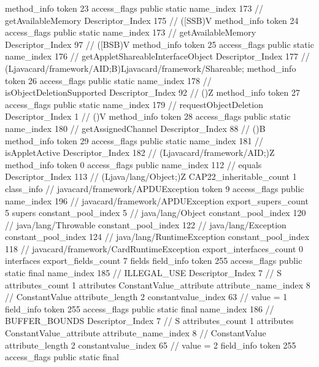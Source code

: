 {{{{{				}
				method_info {
					token	23
					access_flags	public static
					name_index	173		// getAvailableMemory
					Descriptor_Index	175		// ([SSB)V
				}
				method_info {
					token	24
					access_flags	public static
					name_index	173		// getAvailableMemory
					Descriptor_Index	97		// ([BSB)V
				}
				method_info {
					token	25
					access_flags	public static
					name_index	176		// getAppletShareableInterfaceObject
					Descriptor_Index	177		// (Ljavacard/framework/AID;B)Ljavacard/framework/Shareable;
				}
				method_info {
					token	26
					access_flags	public static
					name_index	178		// isObjectDeletionSupported
					Descriptor_Index	92		// ()Z
				}
				method_info {
					token	27
					access_flags	public static
					name_index	179		// requestObjectDeletion
					Descriptor_Index	1		// ()V
				}
				method_info {
					token	28
					access_flags	public static
					name_index	180		// getAssignedChannel
					Descriptor_Index	88		// ()B
				}
				method_info {
					token	29
					access_flags	public static
					name_index	181		// isAppletActive
					Descriptor_Index	182		// (Ljavacard/framework/AID;)Z
				}
				method_info {
					token	0
					access_flags	public
					name_index	112		// equals
					Descriptor_Index	113		// (Ljava/lang/Object;)Z
				}
			}
			CAP22_inheritable_count	1
		}
		class_info {		// javacard/framework/APDUException
			token	9
			access_flags	public
			name_index	196		// javacard/framework/APDUException
			export_supers_count	5
			supers {
				constant_pool_index	5		// java/lang/Object
				constant_pool_index	120		// java/lang/Throwable
				constant_pool_index	122		// java/lang/Exception
				constant_pool_index	124		// java/lang/RuntimeException
				constant_pool_index	118		// javacard/framework/CardRuntimeException
			}
			export_interfaces_count	0
			interfaces {
			}
			export_fields_count	7
			fields {
			field_info {
				token	255
				access_flags	public static final
				name_index	185		// ILLEGAL_USE
				Descriptor_Index	7		// S
				attributes_count	1
				attributes {
				ConstantValue_attribute {
					attribute_name_index	8		// ConstantValue
					attribute_length	2
					constantvalue_index	63		// value = 1
				}
				}
			}
			field_info {
				token	255
				access_flags	public static final
				name_index	186		// BUFFER_BOUNDS
				Descriptor_Index	7		// S
				attributes_count	1
				attributes {
				ConstantValue_attribute {
					attribute_name_index	8		// ConstantValue
					attribute_length	2
					constantvalue_index	65		// value = 2
				}
				}
			}
			field_info {
				token	255
				access_flags	public static final
}}}}}
